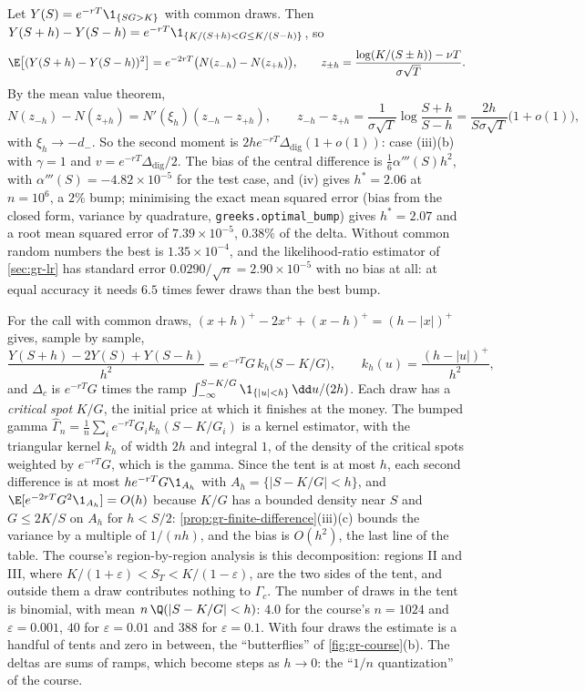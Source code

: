 \begin{example}\label{exa:gr-digital}
Let $Y(S)=e^{-rT}\1_{\{SG>K\}}$ with common draws. Then
$Y(S+h)-Y(S-h)=e^{-rT}\1_{\{K/(S+h)<G\le K/(S-h)\}}$, so
\[
  \E\big[(Y(S+h)-Y(S-h))^2\big]=e^{-2rT}\big(N(z_{-h})-N(z_{+h})\big),\qquad
  z_{\pm h}=\frac{\log(K/(S\pm h))-\nu T}{\sigma\sqrt T}.
\]
By the mean value theorem,
\[
  N(z_{-h})-N(z_{+h})=N'(\xi_h)(z_{-h}-z_{+h}),\qquad
  z_{-h}-z_{+h}=\frac{1}{\sigma\sqrt T}\log\frac{S+h}{S-h}=\frac{2h}{S\sigma\sqrt T}\big(1+o(1)\big),
\]
with $\xi_h\to-d_-$. So the second moment is $2he^{-rT}\Delta_{\mathrm{dig}}(1+o(1))$: case (iii)(b)
with $\gamma=1$ and $v=e^{-rT}\Delta_{\mathrm{dig}}/2$. The bias of the central difference is
$\frac16\alpha'''(S)h^2$, with $\alpha'''(S)=-4.82\times10^{-5}$ for the test case, and (iv)
gives $h^*=2.06$ at $n=10^6$, a $2\%$ bump; minimising the exact mean squared error (bias from
the closed form, variance by quadrature, \texttt{greeks.optimal\_bump}) gives $h^*=2.07$ and a
root mean squared error of $7.39\times10^{-5}$, $0.38\%$ of the delta. Without common random
numbers the best is $1.35\times10^{-4}$, and the likelihood-ratio estimator of
\cref{sec:gr-lr} has standard error $0.0290/\sqrt n=2.90\times10^{-5}$ with no bias at all: at
equal accuracy it needs $6.5$ times fewer draws than the best bump.
\end{example}

\begin{remark}\label{rem:gr-kernel}
For the call with common draws, $(x+h)^+-2x^++(x-h)^+=(h-|x|)^+$ gives, sample by sample,
\[
  \frac{Y(S+h)-2Y(S)+Y(S-h)}{h^2}=e^{-rT}G\,k_h\big(S-K/G\big),\qquad k_h(u)=\frac{(h-|u|)^+}{h^2},
\]
and $\Delta_c$ is $e^{-rT}G$ times the ramp $\int_{-\infty}^{S-K/G}\1_{\{|u|<h\}}\,\dd u/(2h)$. Each draw has a
\emph{critical spot} $K/G$, the initial price at which it finishes at the money. The bumped
gamma $\hat\Gamma_n=\frac1n\sum_ie^{-rT}G_ik_h(S-K/G_i)$ is a kernel estimator, with the
triangular kernel $k_h$ of width $2h$ and integral $1$, of the density of the critical spots
weighted by $e^{-rT}G$, which is the gamma. Since the tent is at most $h$, each second
difference is at most $he^{-rT}G\1_{A_h}$ with $A_h=\{|S-K/G|<h\}$, and
$\E[e^{-2rT}G^2\1_{A_h}]=O(h)$ because $K/G$ has a bounded density near $S$ and $G\le2K/S$ on
$A_h$ for $h<S/2$: \cref{prop:gr-finite-difference}(iii)(c) bounds the variance by a multiple of
$1/(nh)$, and the bias is $O(h^2)$, the last line of the table. The course's region-by-region analysis is this
decomposition: regions II and III, where $K/(1+\varepsilon)<S_T<K/(1-\varepsilon)$, are the two
sides of the tent, and outside them a draw contributes nothing to $\Gamma_c$. The number of
draws in the tent is binomial, with mean $n\,\Q(|S-K/G|<h)$: $4.0$ for the course's $n=1024$
and $\varepsilon=0.001$, $40$ for $\varepsilon=0.01$ and $388$ for $\varepsilon=0.1$. With four
draws the estimate is a handful of tents and zero in between, the ``butterflies'' of
\cref{fig:gr-course}(b). The deltas are sums of ramps, which become steps as $h\to0$: the
``$1/n$ quantization'' of the course.
\end{remark}

